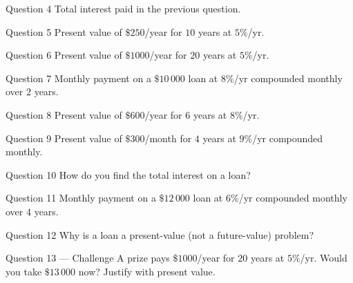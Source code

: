 \documentclass[11pt]{article}
\begin{document}
\begin{qbox}{Question 4}
Total interest paid in the previous question.\workspace{2.4cm}
\end{qbox}

\begin{qbox}{Question 5}
Present value of $\$250$/year for $10$ years at $5\%$/yr.\workspace{2.4cm}
\end{qbox}

\begin{qbox}{Question 6}
Present value of $\$1000$/year for $20$ years at $5\%$/yr.\workspace{2.4cm}
\end{qbox}

\begin{qbox}{Question 7}
Monthly payment on a $\$10\,000$ loan at $8\%$/yr compounded monthly over $2$ years.\workspace{2.4cm}
\end{qbox}

\begin{qbox}{Question 8}
Present value of $\$600$/year for $6$ years at $8\%$/yr.\workspace{2.4cm}
\end{qbox}

\begin{qbox}{Question 9}
Present value of $\$300$/month for $4$ years at $9\%$/yr compounded monthly.\workspace{2.4cm}
\end{qbox}

\begin{qbox}{Question 10}
How do you find the total interest on a loan?\workspace{2.4cm}
\end{qbox}

\begin{qbox}{Question 11}
Monthly payment on a $\$12\,000$ loan at $6\%$/yr compounded monthly over $4$ years.\workspace{2.4cm}
\end{qbox}

\begin{qbox}{Question 12}
Why is a loan a present-value (not a future-value) problem?\workspace{2.4cm}
\end{qbox}

\begin{qbox}{Question 13 --- Challenge}
A prize pays $\$1000$/year for $20$ years at $5\%$/yr. Would you take $\$13\,000$ now? Justify with present value.\workspace{3.2cm}
\end{qbox}

\clearpage
{}
\end{document}
